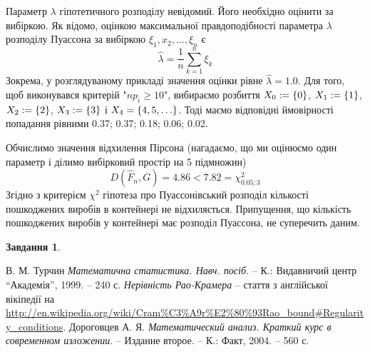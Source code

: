 \documentclass[12pt]{article} %
\newtheorem{prob}{Завдання}
\begin{document}
	Параметр $\lambda$ гіпотетичного розподілу невідомий. Його необхідно оцінити за вибіркою. Як відомо, оцінкою максимальної правдоподібності
	параметра $\lambda$ розподілу Пуассона за вибіркою $\xi_1,x_2,\hdots,\xi_n$ є
	\[\hat{\lambda}=\frac{1}{n}\sum_{k=1}^n\xi_k\]
	Зокрема, у розглядуваному прикладі значення оцінки рівне $\hat{\lambda}=1.0$. Для того, щоб виконувався критерій "$np_i\geq10$",
	вибираємо розбиття $X_0:=\left\{0\right\}$, $X_1:=\left\{1\right\}$, $X_2:=\left\{2\right\}$, $X_3:=\left\{3\right\}$ і $X_4=\left\{4,5,\hdots\right\}$. Тоді маємо 
	відповідні ймовірності попадання рівними 0.37; 0.37; 0.18; 0.06; 0.02.

	Обчислимо значення відхилення Пірсона (нагадаємо, що ми оцінюємо один параметр і ділимо вибірковий простір на 5 підмножин)
	\[D(\hat{F}_n,G)=4.86<7.82=\chi^2_{0.05;3}\]
	Згідно з критерієм $\chi^2$ гіпотеза про Пуассонівський розподіл кількості пошкоджених виробів в контейнері не відхиляється. Припущення,
	що кількість пошкоджених виробів у контейнері має розподіл Пуассона, не суперечить даним.
\begin{prob}\end{prob}

\begin{thebibliography}{9}
В. М. Турчин \emph{Математична статистика. Навч. посіб.} --
К.: Видавничий центр ``Академія'', 1999. -- 240 с.
{\em Нерівність Рао-Крамера} -- стаття з англійської вікіпедії на
\url{http://en.wikipedia.org/wiki/Cram%C3%A9r%E2%80%93Rao_bound#Regularity_conditions}.
Дороговцев А. Я. {\em Математический анализ. Краткий курс в современном изложении}. -- Издание второе. --
	К.: Факт, 2004. -- 560 с.
\end{thebibliography}
\end{document}
